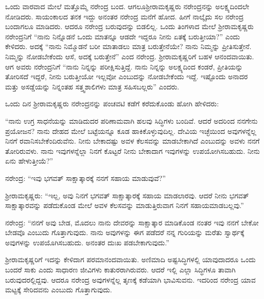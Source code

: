 ಒಂದು ವಾರವಾದ ಮೇಲೆ ಮತ್ತೊಮ್ಮೆ ನರೇಂದ್ರ ಬಂದ. ಆಗಲೂ\break ಶ‍್ರೀರಾಮಕೃಷ್ಣರು ನರೇಂದ್ರನನ್ನು ಅಲಕ್ಷ್ಯದಿಂದಲೇ ನೋಡಿದರು. ಸಾಯಂಕಾಲದ ತನಕ ಇದ್ದು ಅನಂತರ ನರೇಂದ್ರ ಮನೆಗೆ ಹೋದ. ಹೀಗೆ ನಾಲ್ಕೈದು ಸಲ ನರೇಂದ್ರ ಬಂದಾಗಲೂ ಮಾಡಿದರು. ಆದರೂ ನರೇಂದ್ರ ಬರುವುದನ್ನು ಬಿಡಲಿಲ್ಲ. ಒಂದು ತಿಂಗಳಾದ ಮೇಲೆ ಶ‍್ರೀರಾಮಕೃಷ್ಣರು ನರೇಂದ್ರನಿಗೆ “ನಾನು ನಿನ್ನೊಡನೆ ಒಂದು ಮಾತನ್ನೂ ಆಡದೇ ಇದ್ದರೂ ನೀನು ಏತಕ್ಕೆ ಬರುತ್ತೀಯಾ?” ಎಂದು ಕೇಳಿದರು. ಅದಕ್ಕೆ “ನಾನು ನಿಮ್ಮೊಡನೆ ಬರೀ ಮಾತಾಡಲು ಮಾತ್ರ ಬರುತ್ತೇನೆಯೇ? ನಾನು ನಿಮ್ಮನ್ನು ಪ್ರೀತಿಸುತ್ತೇನೆ. ನಿಮ್ಮನ್ನು ನೋಡಬೇಕೆಂದು ಆಸೆ, ಅದಕ್ಕೆ ಬರುತ್ತೇನೆ” ಎಂದ ನರೇಂದ್ರ. ಶ‍್ರೀರಾಮಕೃಷ್ಣರಿಗೆ ಬಹಳ ಆನಂದವಾಯಿತು. ಆಗ ಅವರು ನರೇಂದ್ರನಿಗೆ “ನಾನು ನಿನ್ನನ್ನು ಪರೀಕ್ಷಿಸುತ್ತಿದ್ದೆ. ನಾನು ನಿನ್ನನ್ನು ಅಲಕ್ಷ್ಯದಿಂದ ಕಂಡರೆ, ಪ್ರೀತಿಯನ್ನು ತೋರಿಸದೆ ಇದ್ದರೆ, ನೀನು ಬರುತ್ತೀಯೋ ಇಲ್ಲವೋ ಎಂಬುದನ್ನು ನೋಡಬೇಕೆಂದು ಇದ್ದೆ. ಇಷ್ಟೊಂದು ಅನಾದರ ಮತ್ತು ಅಸಡ್ಡೆಯನ್ನು ನಿನ್ನಂತಹ ಸತ್ತ್ವಶಾಲಿಗಳು ಮಾತ್ರ ಸಹಿಸಬಲ್ಲರು” ಎಂದರು.

ಒಂದು ದಿನ ಶ‍್ರೀರಾಮಕೃಷ್ಣರು ನರೇಂದ್ರನನ್ನು ಪಂಚವಟಿ ಕಡೆಗೆ ಕರೆದುಕೊಂಡು ಹೋಗಿ ಹೇಳಿದರು:

“ನಾನು ಉಗ್ರ ಸಾಧನೆಯನ್ನು ಮಾಡಿದುದರ ಪರಿಣಾಮವಾಗಿ ಹಲವು ಸಿದ್ಧಿಗಳು ಬಂದಿವೆ. ಆದರೆ ಅದರಿಂದ ನನಗೇನು ಪ್ರಯೋಜನ? ನಾನು ದೇಹದ ಮೇಲೆ ಬಟ್ಟೆಯನ್ನೂ ಕೂಡ ಹಾಕಿಕೊಳ್ಳುವುದಿಲ್ಲ. ದೇವಿಯ ಇಚ್ಛೆಯಿಂದ ಅವುಗಳನ್ನೆಲ್ಲ ನಿನಗೆ ರವಾನಿಸಬೇಕೆಂದಿರುವೆನು. ನೀನು ಬೇಕಾದಷ್ಟು ಅವಳ ಕೆಲಸವನ್ನು ಮಾಡಬೇಕಾಗಿದೆ ಎಂಬುದನ್ನು ಅವಳು ನನಗೆ ತೋರಿರುವಳು. ನಾನು ಇವುಗಳನ್ನೆಲ್ಲಾ ನಿನಗೆ ಕೊಟ್ಟರೆ ನೀನು ಬೇಕಾದಾಗ ಇವುಗಳನ್ನು ಉಪಯೋಗಿಸಬಹುದು. ನೀನು ಏನು ಹೇಳುತ್ತೀಯೆ?”

ನರೇಂದ್ರ: “ಇವು ಭಗವತ್ ಸಾಕ್ಷಾತ್ಕಾರಕ್ಕೆ ನನಗೆ ಸಹಾಯ ಮಾಡುವುವೆ?”

ಶ‍್ರೀರಾಮಕೃಷ್ಣರು: “ಇಲ್ಲ, ಅವು ನಿನಗೆ ಭಗವತ್ ಸಾಕ್ಷಾತ್ಕಾರಕ್ಕೆ ಸಹಾಯ ಮಾಡಲಾರವು. ಆದರೆ ನೀನು ಭಗವತ್ ಸಾಕ್ಷಾತ್ಕಾರವನ್ನು ಪಡೆದುಕೊಂಡ ಮೇಲೆ ಅವಳ ಕೆಲಸವನ್ನು ಮಾಡುತ್ತಿರುವಾಗ ನಿನಗೆ ಸಹಾಯಮಾಡಬಲ್ಲವು.”

ನರೇಂದ್ರ: “ನನಗೆ ಅವು ಬೇಡ, ಮೊದಲು ನಾನು ದೇವರನ್ನು ಸಾಕ್ಷಾತ್ಕಾರ ಮಾಡಿಕೊಂಡ ನಂತರ ಇವು ನನಗೆ ಬೇಕೋ ಬೇಡವೊ ಎಂಬುದು ಗೊತ್ತಾಗುವುದು. ನಾನು ಅವುಗಳನ್ನು ಈಗ ಪಡೆದರೆ ನನ್ನ ಗುರಿಯನ್ನು ಮರೆತು ಸ್ವಾರ್ಥಕ್ಕೆ ಅವುಗಳನ್ನು ಉಪಯೊಗಿಸಬಹುದು. ಅನಂತರ ದುಃಖ ಪಡಬೇಕಾಗುವುದು.”

ಶ‍್ರೀರಾಮಕೃಷ್ಣರಿಗೆ ಇದನ್ನು ಕೇಳಿದಾಗ ಪರಮಾನಂದವಾಯಿತು. ಅಣಿಮಾದಿ ಅಷ್ಟಸಿದ್ಧಿಗಳಲ್ಲಿ ಯಾವುದಾದರೂ ಒಂದು ಬಂದರೆ ಸಾಕು ಎಂದು ಸಾಧಾರಣ ಜೀವಿಗಳು ಕಾತುರರಾಗಿರುವರು. ಆದರೆ ಇಲ್ಲಿ ಎಲ್ಲಾ ಸಿದ್ಧಿಗಳೂ ತಾವಾಗಿ ಬರುವುದರಲ್ಲಿದ್ದವು. ಆದರೂ ನರೇಂದ್ರ ಅವುಗಳನ್ನೆಲ್ಲ ತೃಣಕ್ಕೆ ಕಡೆಯಾಗಿ ಭಾವಿಸುವನು. ಇದರಿಂದ ನರೇಂದ್ರ ಯಾವ ಮಟ್ಟಕ್ಕೆ ಸೇರಿದವನು ಎಂಬುದು ಗೊತ್ತಾಗುವುದು.

